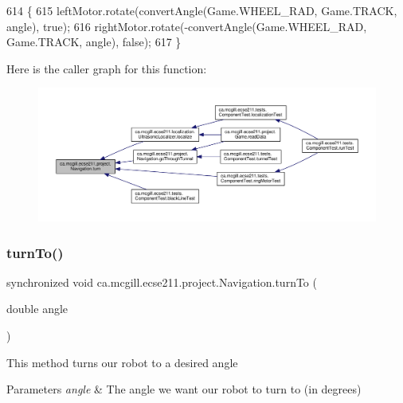 \begin{DoxyCode}
614                               \{
615     leftMotor.rotate(convertAngle(Game.WHEEL\_RAD, Game.TRACK, angle), \textcolor{keyword}{true});
616     rightMotor.rotate(-convertAngle(Game.WHEEL\_RAD, Game.TRACK, angle), \textcolor{keyword}{false});
617   \}
\end{DoxyCode}
Here is the caller graph for this function\+:\nopagebreak
\begin{figure}[H]
\begin{center}
\leavevmode
\includegraphics[width=350pt]{classca_1_1mcgill_1_1ecse211_1_1project_1_1_navigation_ad74286ad36d333bfaf57661837457b76_icgraph}
\end{center}
\end{figure}
\mbox{\label{classca_1_1mcgill_1_1ecse211_1_1project_1_1_navigation_a3bbe0645f2b3b3d0986b4a707fb5a00c}} 
\subsubsection{\texorpdfstring{turn\+To()}{turnTo()}}
{\footnotesize\ttfamily synchronized void ca.\+mcgill.\+ecse211.\+project.\+Navigation.\+turn\+To (\begin{DoxyParamCaption}\item[{double}]{angle }\end{DoxyParamCaption})}

This method turns our robot to a desired angle


\begin{DoxyParams}{Parameters}
{\em angle} & The angle we want our robot to turn to (in degrees) \\
\hline
\end{DoxyParams}


